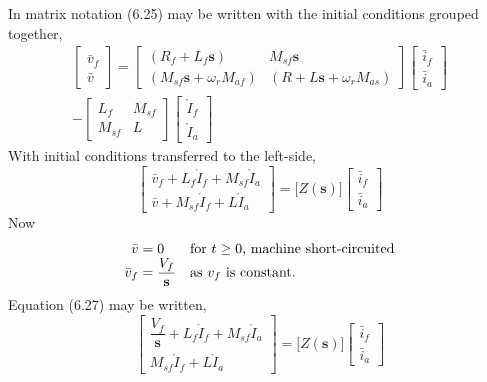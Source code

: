 \documentclass[a4paper,numbers=noenddot,12pt]{scrbook}
\begin{document}
In matrix notation (6.25) may be written with the initial conditions grouped together,
\begin{multline}
    \begin{bmatrix}
        \bar v_f \\[2ex] \bar v
    \end{bmatrix} = 
    \begin{bmatrix}
        (R_f + L_f \mathbf{s} ) & M_{sf}\mathbf s  \\[2ex]
        (M_{sf} \mathbf{s} + \omega_r M_{af} ) & (R + L\mathbf{s}+\omega_r M_{as} )
    \end{bmatrix}
    \begin{bmatrix}
        \bar i_f \\[2ex] \bar i_a %
    \end{bmatrix} \\
    - 
    \begin{bmatrix}
        L_f & M_{sf} \\[2ex]
        M_{sf} & L
    \end{bmatrix}
    \begin{bmatrix}
        \mathring I_f \\[2ex] \mathring I_a
    \end{bmatrix}
\end{multline}
With initial conditions transferred to the left-side,
\begin{equation}
    \begin{bmatrix}
        \bar v_f + L_f \mathring I_f + M_{sf} \mathring I_a \\[2ex]
        \bar v + M_{sf} \mathring I_f + L \mathring I_a
    \end{bmatrix}
    =
    \Bigg[ Z(\mathbf s)\Bigg]
    \begin{bmatrix}
        \bar i_f \\[2ex] \bar i_a %
    \end{bmatrix}
    \label{}
\end{equation}
Now
\begin{equation*}
    \begin{array}{r@{\;=\;}ll}
        \bar v & 0 & \text{for } t \geq 0 \text{, machine short-circuited} \\
        \bar v_f & \dfrac{V_f}{\mathbf s} &\text{as } v_f \text{\ is constant.}
    \end{array}
\end{equation*}
Equation (6.27) may be written,
\begin{equation}
    \begin{bmatrix}
        \dfrac{V_f}{\textbf{s}} + L_f \mathring I_f + M_{sf} \mathring I_a \\[2ex]
        M_{sf} \mathring I_f + L \mathring I_a
    \end{bmatrix}
    =
    \Bigg[ Z(\textbf{s})\Bigg]
    \begin{bmatrix}
        \bar i_f \\ \bar i_a %
    \end{bmatrix}
    \label{}
\end{equation}
\end{document}
